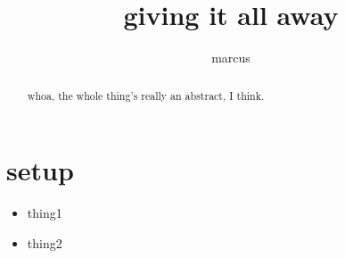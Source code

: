 \documentclass[11pt]{article}
\title{giving it all away}
\author{marcus}
\date{}
\begin{document}
\maketitle

\begin{abstract}
whoa, the whole thing's really an abstract, I think.
\end{abstract}

\section{setup}
\begin{itemize}
 \item thing1
 \item thing2
\end{itemize}
\end{document}
